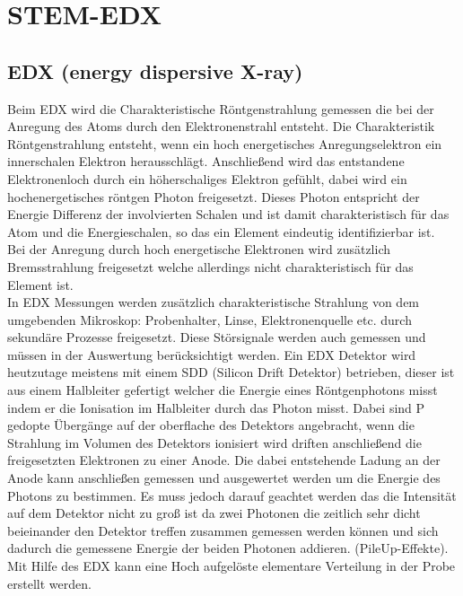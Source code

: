 \section{STEM-EDX}
\subsection{EDX (energy dispersive X-ray)}
Beim EDX wird die Charakteristische Röntgenstrahlung gemessen die bei der Anregung des Atoms durch den Elektronenstrahl entsteht. Die Charakteristik Röntgenstrahlung entsteht, wenn ein hoch energetisches Anregungselektron ein innerschalen Elektron herausschlägt. Anschließend wird das entstandene Elektronenloch durch ein höherschaliges Elektron gefühlt, dabei wird ein hochenergetisches röntgen Photon freigesetzt. Dieses Photon entspricht der Energie Differenz der involvierten Schalen und ist damit charakteristisch für das Atom und die Energieschalen, so das ein Element eindeutig identifizierbar ist.\\
Bei der Anregung durch hoch energetische Elektronen wird zusätzlich Bremsstrahlung freigesetzt welche allerdings nicht charakteristisch für das Element ist. \\
In EDX Messungen werden zusätzlich charakteristische Strahlung von dem umgebenden Mikroskop: Probenhalter, Linse, Elektronenquelle etc. durch sekundäre Prozesse freigesetzt. Diese Störsignale werden auch gemessen und müssen in der Auswertung berücksichtigt werden.
Ein EDX Detektor wird heutzutage meistens mit einem SDD (Silicon Drift Detektor) betrieben, dieser ist aus einem Halbleiter gefertigt welcher die Energie eines Röntgenphotons misst indem er die Ionisation im Halbleiter durch das Photon misst. Dabei sind P gedopte Übergänge auf der oberflache des Detektors angebracht, wenn die Strahlung im Volumen des Detektors ionisiert wird driften anschließend die freigesetzten Elektronen zu einer Anode. Die dabei entstehende Ladung an der Anode kann anschließen gemessen und ausgewertet werden um die Energie des Photons zu bestimmen. Es muss jedoch darauf geachtet werden das die Intensität auf dem Detektor nicht zu groß ist da zwei Photonen die zeitlich sehr dicht beieinander den Detektor treffen zusammen gemessen werden können und sich dadurch die gemessene Energie der beiden Photonen addieren. (PileUp-Effekte).\\
Mit Hilfe des EDX kann eine Hoch aufgelöste elementare Verteilung in der Probe erstellt werden.

